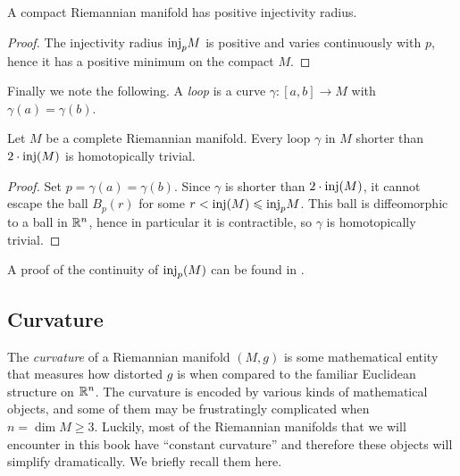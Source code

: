 \begin{prop} \label{iniettivita:prop}
A compact Riemannian manifold has positive injectivity radius.
\end{prop}
\begin{proof}
The injectivity radius ${\rm inj}_p M$ is positive and varies continuously with $p$, hence it has a positive minimum on the compact $M$.
\end{proof}

Finally we note the following. A \emph{loop} is a curve $\gamma\colon [a,b] \to M$ with $\gamma(a) = \gamma(b)$.

\begin{prop}
Let $M$ be a complete Riemannian manifold. Every loop $\gamma$ in $M$ shorter than $2\cdot {\rm inj} (M)$ is homotopically trivial.
\end{prop}
\begin{proof}
Set $p=\gamma(a) = \gamma (b)$. Since $\gamma$ is shorter than $2\cdot{\rm inj} (M)$, it cannot escape the ball $B_p(r)$ for some $r<{\rm inj} (M)\leqslant {\rm inj}_p M$. This ball is diffeomorphic to a ball in $\mathbb{R}^n$, hence in particular it is contractible, so $\gamma$ is homotopically trivial.
\end{proof}

A proof of the continuity of ${\rm inj}_p(M)$ can be found in \cite{Lee}.

\subsection{Curvature} \label{curvatura:subsection}
The \emph{curvature} of a Riemannian manifold $(M,g)$ is some mathematical entity that measures how distorted $g$ is when compared to the familiar Euclidean structure on $\mathbb{R}^n$. The curvature is encoded by various kinds of mathematical objects, and some of them may be frustratingly complicated when $n=\dim M \geqslant 3$. Luckily, most of the Riemannian manifolds that we will encounter in this book have ``constant curvature'' and therefore these objects will simplify dramatically. We briefly recall them here.

